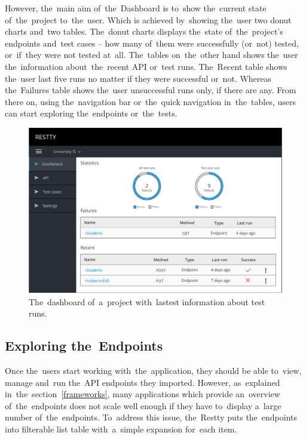 However, the~main aim of~the~Dashboard is to~show the~current state
of~the~project to~the~user. Which is achieved by~showing the~user two donut
charts and~two tables. The~donut charts displays the~state of~the~project's
endpoints and~test cases -- how many of~them were successfully (or~not) tested,
or~if~they were not tested at~all. The~tables on~the~other hand shows the~user
the~information about~the~recent API or~test runs. The~Recent table shows
the~user last five runs no matter if they were successful or~not. Whereas
the~Failures table shows the~user unsuccessful runs only, if there are any. From
there on, using the~navigation bar or~the~quick navigation in~the~tables, users
can start exploring the~endpoints or~the~tests.

\begin{figure}[!hbt]
	\centering
	\includegraphics[scale=0.6]{./designs/dashboard.pdf}
	\caption{The~dashboard of~a~project with~lastest information about test runs.}
	\label{fig-dashboard}
\end{figure}

\subsection{Exploring the~Endpoints}
Once the~users start working with~the~application, they should be able to~view,
manage and~run the~API endpoints they imported. However, as~explained
in~the~section~\ref{frameworks}, many applications which provide an~overview
of~the~endpoints does not scale well enough if they have to~display a~large
number of~the~endpoints. To~address this issue, the~Restty puts the~endpoints
into filterable list table with~a~simple expansion for~each item. 

